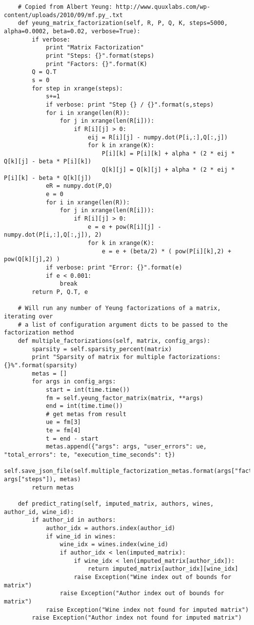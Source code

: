 \begin{verbatim}
    # Copied from Albert Yeung: http://www.quuxlabs.com/wp-content/uploads/2010/09/mf.py_.txt
    def yeung_matrix_factorization(self, R, P, Q, K, steps=5000, alpha=0.0002, beta=0.02, verbose=True):
        if verbose:
            print "Matrix Factorization"
            print "Steps: {}".format(steps)
            print "Factors: {}".format(K)
        Q = Q.T
        s = 0
        for step in xrange(steps):
            s+=1
            if verbose: print "Step {} / {}".format(s,steps)
            for i in xrange(len(R)):
                for j in xrange(len(R[i])):
                    if R[i][j] > 0:
                        eij = R[i][j] - numpy.dot(P[i,:],Q[:,j])
                        for k in xrange(K):
                            P[i][k] = P[i][k] + alpha * (2 * eij * Q[k][j] - beta * P[i][k])
                            Q[k][j] = Q[k][j] + alpha * (2 * eij * P[i][k] - beta * Q[k][j])
            eR = numpy.dot(P,Q)
            e = 0
            for i in xrange(len(R)):
                for j in xrange(len(R[i])):
                    if R[i][j] > 0:
                        e = e + pow(R[i][j] - numpy.dot(P[i,:],Q[:,j]), 2)
                        for k in xrange(K):
                            e = e + (beta/2) * ( pow(P[i][k],2) + pow(Q[k][j],2) )
            if verbose: print "Error: {}".format(e)
            if e < 0.001:
                break
        return P, Q.T, e

    # Will run any number of Yeung factorizations of a matrix, iterating over 
    # a list of configuration argument dicts to be passed to the factorization method
    def multiple_factorizations(self, matrix, config_args):
        sparsity = self.sparsity_percent(matrix)
        print "Sparsity of matrix for multiple factorizations: {}%".format(sparsity)
        metas = []
        for args in config_args:
            start = int(time.time())
            fm = self.yeung_factor_matrix(matrix, **args)
            end = int(time.time())
            # get metas from result
            ue = fm[3]
            te = fm[4]
            t = end - start
            metas.append({"args": args, "user_errors": ue, "total_errors": te, "execution_time_seconds": t})
            self.save_json_file(self.multiple_factorization_metas.format(args["factors"], args["steps"]), metas)
        return metas

    def predict_rating(self, imputed_matrix, authors, wines, author_id, wine_id):
        if author_id in authors:
            author_idx = authors.index(author_id)
            if wine_id in wines:
                wine_idx = wines.index(wine_id)
                if author_idx < len(imputed_matrix):
                    if wine_idx < len(imputed_matrix[author_idx]):
                        return imputed_matrix[author_idx][wine_idx]
                    raise Exception("Wine index out of bounds for matrix")
                raise Exception("Author index out of bounds for matrix")
            raise Exception("Wine index not found for imputed matrix")
        raise Exception("Author index not found for imputed matrix")


\end{verbatim}
